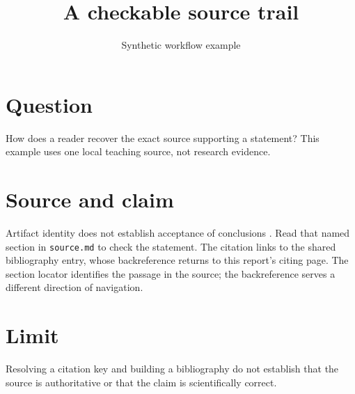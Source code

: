 \documentclass[11pt]{article}
\title{A checkable source trail}
\author{Synthetic workflow example}
\date{}
\begin{document}
\maketitle
\section{Question}
How does a reader recover the exact source supporting a statement?
This example uses one local teaching source, not research evidence.

\section{Source and claim}
Artifact identity does not establish acceptance of conclusions
\cite[sec.~Acceptance]{work:example-evidence-v1}.
Read that named section in \texttt{source.md} to check the statement.
The citation links to the shared bibliography entry, whose backreference returns
to this report's citing page. The section locator identifies the passage in the
source; the backreference serves a different direction of navigation.

\section{Limit}
Resolving a citation key and building a bibliography do not establish that the
source is authoritative or that the claim is scientifically correct.
\printbibliography
\end{document}
